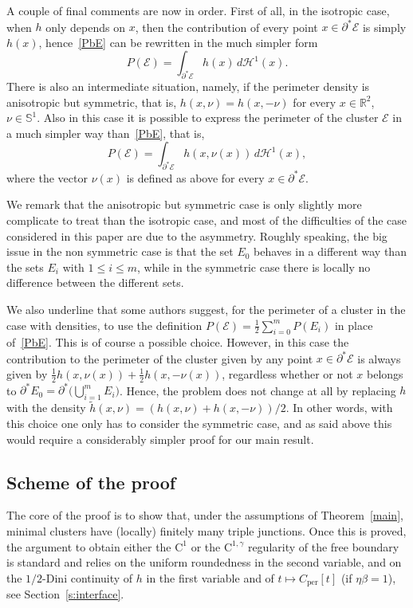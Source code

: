 \documentclass[JEP,XML,SOM,Unicode,NoFloatCountersInSection]{cedram}
\newcommand\R{\mathbb{R}}
\renewcommand\S{\mathbb{S}}
\newcommand\Ceeb{C_\mathrm{per}}
\newcommand\E{\mathcal{E}}
\renewcommand\H{\mathcal{H}}
\theoremstyle{plain}
\theoremstyle{definition}
\begin{document}
A couple of final comments are now in order. First of all, in the isotropic case, \ie when $h$ only depends on $x$, then the contribution of every point $x\in\partial^*\E$ is simply $h(x)$, hence~\eqref{PbE} can be rewritten in the much simpler form
\[
P(\E) = \int_{\partial^*\E} h(x)\, d\H^1(x).
\]
There is also an intermediate situation, namely, if the perimeter density is anisotropic but symmetric, that is, $h(x,\nu)=h(x,-\nu)$ for every $x\in\R^2$, $\nu\in\S^1$. Also in this case it is possible to express the perimeter of the cluster $\E$ in a much simpler way than~\eqref{PbE}, that is,
\[
P(\E) = \int_{\partial^*\E} h(x,\nu(x))\, d\H^1(x),
\]
where the vector $\nu(x)$ is defined as above for every $x\in\partial^*\E$.

We remark that the anisotropic but symmetric case is only slightly more complicate to treat than the isotropic case, and most of the difficulties of the case considered in this paper are due to the asymmetry. Roughly speaking, the big issue in the non symmetric case is that the set $E_0$ behaves in a different way than the sets $E_i$ with $1\leq i \leq m$, while in the symmetric case there is locally no difference between the different sets.

We also underline that some authors suggest, for the perimeter of a cluster in the case with densities, to use the definition $P(\E) = \frac 12 \sum_{i=0}^m P(E_i)$ in place of~\eqref{PbE}. This is of course a possible choice. However, in this case the contribution to the perimeter of the cluster given by any point $x\in\partial^*\E$ is always given by $\frac 12 h(x,\nu(x))+ \frac 12 h(x,-\nu(x))$, regardless whether or not $x$ belongs to $\partial^* E_0 = \partial^* \big(\bigcup_{i=1}^m E_i\big)$. Hence, the problem does not change at all by replacing $h$ with the density $\tilde h(x,\nu)=(h(x,\nu)+h(x,-\nu))/2$. In other words, with this choice one only has to consider the symmetric case, and as said above this would require a considerably simpler proof for our main result.\enlargethispage{.5\baselineskip}%

\subsection{Scheme of the proof\label{sec:exproof}}

The core of the proof is to show that, under the assumptions of Theorem~\ref{main}, minimal clusters have (locally) finitely many triple junctions.
Once this is proved, the argument to obtain either the $\mathrm{C}^1$ or the $\mathrm{C}^{1,\gamma}$ regularity of the free boundary is standard and relies on the uniform roundedness in the second variable, and on the $1/2$-Dini continuity of $h$ in the first variable and of $t\mapsto \Ceeb[t]$
(if $\eta\beta=1$), see Section~\ref{s:interface}.
\end{document}
